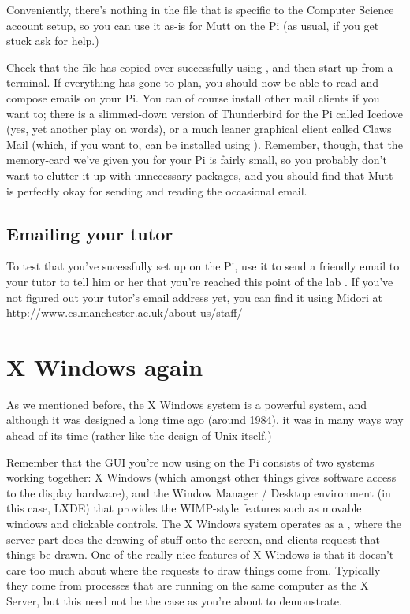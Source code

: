 Conveniently, there's nothing in the  file that is specific to the Computer Science account setup, so you can use it as-is for Mutt on the Pi (as usual, if you get stuck ask for help.)

Check that the file has copied over successfully using , and then start up  from a terminal. If everything has gone to plan, you should now be able to read and compose emails on your Pi. You can of course install other mail clients if you want to; there is a slimmed-down version of Thunderbird for the Pi called Icedove (yes, yet another play on words), or a much leaner graphical client called Claws Mail (which, if you want to, can be installed using ). Remember, though, that the memory-card we've given you for your Pi is fairly small, so you probably don't want to clutter it up with unnecessary packages, and you should find that Mutt is perfectly okay for sending and reading the occasional email. 

\subsection{Emailing your tutor}

To test that you've sucessfully set  up on the Pi, use it to send a friendly email to your tutor to tell him or her that you're reached this point of the lab . If you've not figured out your tutor's email address yet, you can find it using Midori at \\
\url{http://www.cs.manchester.ac.uk/about-us/staff/}

\section{X Windows again}

As we mentioned before, the X Windows system is a powerful system, and although it was designed a long time ago (around 1984), it was in many ways way ahead of its time (rather like the design of Unix itself.)

Remember that the GUI you're now using on the Pi consists of two systems working together: X Windows (which amongst other things gives software access to the display hardware), and the Window Manager / Desktop environment (in this case, LXDE) that provides the WIMP-style features such as movable windows and clickable controls. The X Windows system operates as a , where the server part does the drawing of stuff onto the screen, and clients request that things be drawn. One of the really nice features of X Windows is that it doesn't care too much about where the requests to draw things come from. Typically they come from processes that are running on the same computer as the X Server, but this need not be the case as you're about to demonstrate.

